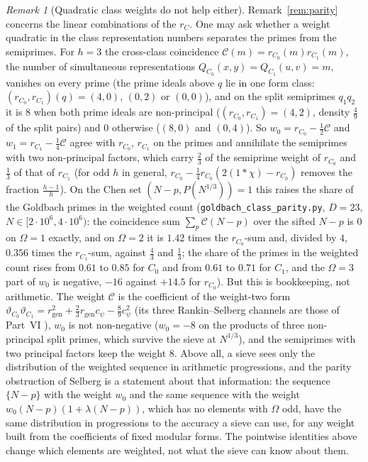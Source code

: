 \documentclass[11pt]{amsart}
\theoremstyle{remark}
\newtheorem{remark}[theorem]{Remark}
\newcommand{\vt}{\vartheta}
\newcommand{\gen}{\mathrm{gen}}
\begin{document}
\begin{remark}[Quadratic class weights do not help either]\label{rem:hbt}
Remark~\ref{rem:parity} concerns the linear combinations of the $r_C$. One may ask whether a weight quadratic in the class representation numbers separates the primes from the semiprimes. For $h=3$ the cross-class coincidence $\mathcal C(m)=r_{C_0}(m)r_{C_1}(m)$, the number of simultaneous representations $Q_{C_0}(x,y)=Q_{C_1}(u,v)=m$, vanishes on every prime (the prime ideals above $q$ lie in one form class: $(r_{C_0},r_{C_1})(q)=(4,0)$, $(0,2)$ or $(0,0)$), and on the split semiprimes $q_1q_2$ it is $8$ when both prime ideals are non-principal ($(r_{C_0},r_{C_1})=(4,2)$, density $\frac49$ of the split pairs) and $0$ otherwise ($(8,0)$ and $(0,4)$). So $w_0=r_{C_0}-\frac12\mathcal C$ and $w_1=r_{C_1}-\frac14\mathcal C$ agree with $r_{C_0}$, $r_{C_1}$ on the primes and annihilate the semiprimes with two non-principal factors, which carry $\frac23$ of the semiprime weight of $r_{C_0}$ and $\frac13$ of that of $r_{C_1}$ (for odd $h$ in general, $r_{C_0}-\frac14r_{C_0}(2(1*\chi)-r_{C_0})$ removes the fraction $\frac{h-1}h$). On the Chen set $(N-p,P(N^{1/3}))=1$ this raises the share of the Goldbach primes in the weighted count (\texttt{goldbach\_class\_parity.py}, $D=23$, $N\in[2\cdot10^6,4\cdot10^6)$: the coincidence sum $\sum_p\mathcal C(N-p)$ over the sifted $N-p$ is $0$ on $\Omega=1$ exactly, and on $\Omega=2$ it is $1.42$ times the $r_{C_0}$-sum and, divided by $4$, $0.356$ times the $r_{C_1}$-sum, against $\frac43$ and $\frac13$; the share of the primes in the weighted count rises from $0.61$ to $0.85$ for $C_0$ and from $0.61$ to $0.71$ for $C_1$, and the $\Omega=3$ part of $w_0$ is negative, $-16$ against $+14.5$ for $r_{C_0}$). But this is bookkeeping, not arithmetic. The weight $\mathcal C$ is the coefficient of the weight-two form $\vt_{C_0}\vt_{C_1}=r_\gen^2+\frac23r_\gen c_\psi-\frac89c_\psi^2$ (its three Rankin--Selberg channels are those of Part~VI \cite{ChenVI}), $w_0$ is not non-negative ($w_0=-8$ on the products of three non-principal split primes, which survive the sieve at $N^{1/3}$), and the semiprimes with two principal factors keep the weight $8$. Above all, a sieve sees only the distribution of the weighted sequence in arithmetic progressions, and the parity obstruction of Selberg is a statement about that information: the sequence $\{N-p\}$ with the weight $w_0$ and the same sequence with the weight $w_0(N-p)(1+\lambda(N-p))$, which has no elements with $\Omega$ odd, have the same distribution in progressions to the accuracy a sieve can use, for any weight built from the coefficients of fixed modular forms. The pointwise identities above change which elements are weighted, not what the sieve can know about them.
\end{remark}
\end{document}
